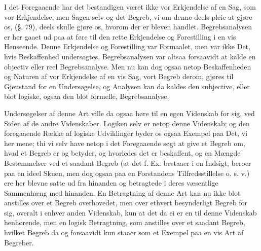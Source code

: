 \documentclass[12pt]{book}
\def\textit#1{#1}%
\newcommand{\opage}[1]{\marginnote{\footnotesize\textit{[#1]}}}
\begin{document}
I det Foregaaende har det bestandigen været ikke vor Erkjendelse af en Sag, som vor
Erkjendelse, men Sagen selv og det Begreb, vi om denne deels pleie at gjøre os, (§. 79),
deels skulle gjøre os, hvorom der er bleven handlet. Begrebsanalysen er her gaaet ud paa
at føre til den rette Erkjendelse og Forestilling i en vis Henseende. Denne Erkjendelse
og Forestilling var Formaalet, men var ikke Det, hvis Beskaffenhed undersøgtes.
Begrebsanalysen var altsaa forsaavidt at kalde en objectiv eller reel Begrebsanalyse.
Men nu kan dog ogsaa netop Beskaffenheden og Naturen af vor Erkjendelse af en vis Sag,
vort Begreb derom, gjøres til Gjenstand for en Undersøgelse, og Analysen kan da kaldes
den subjective, eller blot logiske, ogsaa den blot formelle, Begrebsanalyse.

Undersøgelser af denne Art ville da ogsaa høre til en egen Videnskab for sig, ved Siden
af de andre Videnskaber. Logiken selv er netop denne Videnskab; og den foregaaende Række
af
\opage{224} logiske Udviklinger byder os ogsaa Exempel paa Det, vi her mene; thi vi selv have netop
i det Foregaaende søgt at give et Begreb om, hvad et Begreb er og betyder, og hvorledes
det er beskaffent, og en Mængde Bestemmelser ved et saadant Begreb (at det f. Ex.
bestaaer i en Indsigt, beroer paa en ideel Skuen, men dog ogsaa paa en Forstandens
Tilfredsstillelse o. s. v.) ere her blevne satte ud fra hinanden og betragtede i deres
væsentlige Sammenhæng med hinanden. En Betragtning af denne Art kan nu ikke blot
anstilles over et Begreb overhovedet, men over ethvert besynderligt Begreb for sig,
overalt i enhver anden Videnskab, kun at det da ei er en til denne Videnskab henhørende,
men en logisk Betragtning, som anstilles over et saadant Begreb, hvilket Begreb da og
forsaavidt kun staaer som et Exempel paa en vis Art af Begreber.
\end{document}
